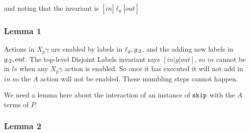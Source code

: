 and noting that the invariant is $[in|\ell_g|out]$

\subsubsection{Lemma 1}

Actions in $X_p\gamma$ are enabled by labels in $\ell_g,g_{:2}$,
and the adding new labels in $g_{:2},out$.
The top-level Disjoint Labels invariant says $[in|g|out]$,
so $in$ cannot be in $ls$ when any $X_p\gamma$ action is enabled.
So once it has executed it will not add in $in$ so the $A$ action
will not be enabled. These mumbling steps cannot happen.

We need a lemma here about the interaction of an instance of $\texttt{skip}$
with the $A$ terms of $P$.


\subsubsection{Lemma 2}

